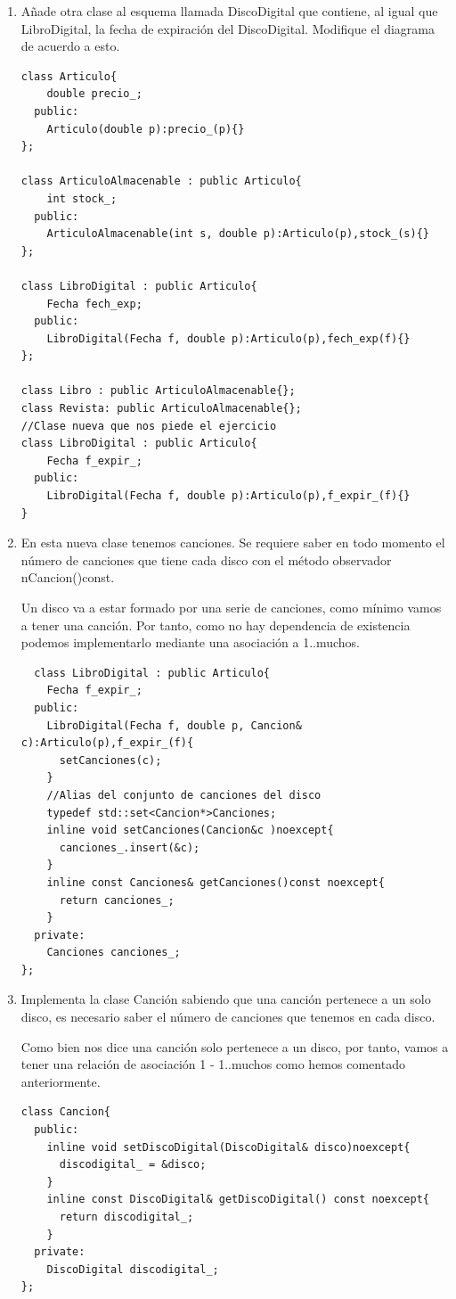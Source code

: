 \begin{enumerate}
  \item Añade otra clase al esquema llamada DiscoDigital que contiene, al igual que LibroDigital, la fecha de expiración del DiscoDigital. Modifique el diagrama de acuerdo a esto.
\begin{verbatim}
class Articulo{
    double precio_;
  public:
    Articulo(double p):precio_(p){}
};

class ArticuloAlmacenable : public Articulo{
    int stock_;
  public:
    ArticuloAlmacenable(int s, double p):Articulo(p),stock_(s){}
};

class LibroDigital : public Articulo{
    Fecha fech_exp;
  public:
    LibroDigital(Fecha f, double p):Articulo(p),fech_exp(f){}
};

class Libro : public ArticuloAlmacenable{};
class Revista: public ArticuloAlmacenable{};
//Clase nueva que nos piede el ejercicio
class LibroDigital : public Articulo{
    Fecha f_expir_;
  public:
    LibroDigital(Fecha f, double p):Articulo(p),f_expir_(f){}
}
\end{verbatim}
  \item En esta nueva clase tenemos canciones. Se requiere saber en todo momento el número de canciones que tiene cada disco con el método observador nCancion()const.

  Un disco va a estar formado por una serie de canciones, como mínimo vamos a tener una canción. Por tanto, como no hay dependencia de existencia podemos implementarlo mediante una asociación a 1..muchos.
\begin{verbatim}
  class LibroDigital : public Articulo{
    Fecha f_expir_;
  public:
    LibroDigital(Fecha f, double p, Cancion& c):Articulo(p),f_expir_(f){
      setCanciones(c);
    }
    //Alias del conjunto de canciones del disco
    typedef std::set<Cancion*>Canciones;
    inline void setCanciones(Cancion&c )noexcept{
      canciones_.insert(&c);
    }
    inline const Canciones& getCanciones()const noexcept{
      return canciones_;
    }
  private:
    Canciones canciones_;
};
\end{verbatim}
  \item Implementa la clase Canción sabiendo que una canción pertenece a un solo disco, es necesario saber el número de canciones que tenemos en cada disco.

  Como bien nos dice una canción solo pertenece a un disco, por tanto, vamos a tener una relación de asociación 1 - 1..muchos como hemos comentado anteriormente.

\begin{verbatim}
class Cancion{
  public:
    inline void setDiscoDigital(DiscoDigital& disco)noexcept{
      discodigital_ = &disco;
    }
    inline const DiscoDigital& getDiscoDigital() const noexcept{
      return discodigital_;
    } 
  private:
    DiscoDigital discodigital_;
};
\end{verbatim}
\end{enumerate}
